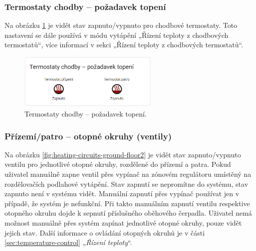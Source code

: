 
\begin{Czech}
\subsubsection{Termostaty chodby – požadavek topení}
\end{Czech}

\begin{Czech}
Na obrázku \ref{fig:corridor-thermostats2} je vidět stav zapnuto/vypnuto pro chodbové termostaty. Toto nastavení se dále používá v módu vytápění „Řízení teploty z chodbových termostatů“, více informací v sekci „Řízení teploty z chodbových termostatů“.
\end{Czech}

\begin{Czech}
\begin{figure}[H]
    \centering
    \includegraphics[width=0.6\textwidth]{pictures/czech/software/corridor-thermostats.png}
    \caption{Termostaty chodby – požadavek topení.}
    \label{fig:corridor-thermostats2}
\end{figure}
\end{Czech}


\begin{Czech}
\subsubsection{Přízemí/patro – otopné okruhy (ventily)}
\end{Czech}

\begin{Czech}
Na obrázku \ref{fig:heating-circuits-ground-floor2} je vidět stav zapnuto/vypnuto ventilu pro jednotlivé otopné okruhy, rozdělené do přízemí a patra. Pokud uživatel manuálně zapne ventil přes vypínač na zónovém regulátoru umístěný na rozdělovačích podlahové vytápění. Stav zapnutí se nepromítne do systému, stav zapnuto není v systému vidět. Manuální zapnutí přes vypínač používat jen v případě, že systém je nefunkční. Při takto manuálním zapnutí ventilu respektive otopného okruhu dojde k sepnutí příslušného oběhového čerpadla. Uživatel nemá možnost manuálně přes systém zapínat jednotlivé otopné okruhy, pouze vidět jejich stav. Další informace o ovládání otopných okruhů je v části \ref{sec:temperature-control} „\textit{Řízení teploty}“.
\end{Czech}

